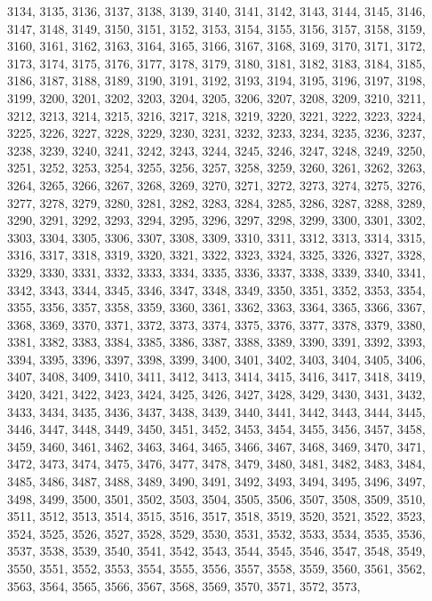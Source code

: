 \documentclass[a4paper,11pt]{article}
\begin{document}
3134, 3135, 3136, 3137, 3138, 3139, 3140, 3141, 3142, 3143, 3144,
3145, 3146, 3147, 3148, 3149, 3150, 3151, 3152, 3153, 3154, 3155,
3156, 3157, 3158, 3159, 3160, 3161, 3162, 3163, 3164, 3165, 3166,
3167, 3168, 3169, 3170, 3171, 3172, 3173, 3174, 3175, 3176, 3177,
3178, 3179, 3180, 3181, 3182, 3183, 3184, 3185, 3186, 3187, 3188,
3189, 3190, 3191, 3192, 3193, 3194, 3195, 3196, 3197, 3198, 3199,
3200, 3201, 3202, 3203, 3204, 3205, 3206, 3207, 3208, 3209, 3210,
3211, 3212, 3213, 3214, 3215, 3216, 3217, 3218, 3219, 3220, 3221,
3222, 3223, 3224, 3225, 3226, 3227, 3228, 3229, 3230, 3231, 3232,
3233, 3234, 3235, 3236, 3237, 3238, 3239, 3240, 3241, 3242, 3243,
3244, 3245, 3246, 3247, 3248, 3249, 3250, 3251, 3252, 3253, 3254,
3255, 3256, 3257, 3258, 3259, 3260, 3261, 3262, 3263, 3264, 3265,
3266, 3267, 3268, 3269, 3270, 3271, 3272, 3273, 3274, 3275, 3276,
3277, 3278, 3279, 3280, 3281, 3282, 3283, 3284, 3285, 3286, 3287,
3288, 3289, 3290, 3291, 3292, 3293, 3294, 3295, 3296, 3297, 3298,
3299, 3300, 3301, 3302, 3303, 3304, 3305, 3306, 3307, 3308, 3309,
3310, 3311, 3312, 3313, 3314, 3315, 3316, 3317, 3318, 3319, 3320,
3321, 3322, 3323, 3324, 3325, 3326, 3327, 3328, 3329, 3330, 3331,
3332, 3333, 3334, 3335, 3336, 3337, 3338, 3339, 3340, 3341, 3342,
3343, 3344, 3345, 3346, 3347, 3348, 3349, 3350, 3351, 3352, 3353,
3354, 3355, 3356, 3357, 3358, 3359, 3360, 3361, 3362, 3363, 3364,
3365, 3366, 3367, 3368, 3369, 3370, 3371, 3372, 3373, 3374, 3375,
3376, 3377, 3378, 3379, 3380, 3381, 3382, 3383, 3384, 3385, 3386,
3387, 3388, 3389, 3390, 3391, 3392, 3393, 3394, 3395, 3396, 3397,
3398, 3399, 3400, 3401, 3402, 3403, 3404, 3405, 3406, 3407, 3408,
3409, 3410, 3411, 3412, 3413, 3414, 3415, 3416, 3417, 3418, 3419,
3420, 3421, 3422, 3423, 3424, 3425, 3426, 3427, 3428, 3429, 3430,
3431, 3432, 3433, 3434, 3435, 3436, 3437, 3438, 3439, 3440, 3441,
3442, 3443, 3444, 3445, 3446, 3447, 3448, 3449, 3450, 3451, 3452,
3453, 3454, 3455, 3456, 3457, 3458, 3459, 3460, 3461, 3462, 3463,
3464, 3465, 3466, 3467, 3468, 3469, 3470, 3471, 3472, 3473, 3474,
3475, 3476, 3477, 3478, 3479, 3480, 3481, 3482, 3483, 3484, 3485,
3486, 3487, 3488, 3489, 3490, 3491, 3492, 3493, 3494, 3495, 3496,
3497, 3498, 3499, 3500, 3501, 3502, 3503, 3504, 3505, 3506, 3507,
3508, 3509, 3510, 3511, 3512, 3513, 3514, 3515, 3516, 3517, 3518,
3519, 3520, 3521, 3522, 3523, 3524, 3525, 3526, 3527, 3528, 3529,
3530, 3531, 3532, 3533, 3534, 3535, 3536, 3537, 3538, 3539, 3540,
3541, 3542, 3543, 3544, 3545, 3546, 3547, 3548, 3549, 3550, 3551,
3552, 3553, 3554, 3555, 3556, 3557, 3558, 3559, 3560, 3561, 3562,
3563, 3564, 3565, 3566, 3567, 3568, 3569, 3570, 3571, 3572, 3573,
\end{document}
